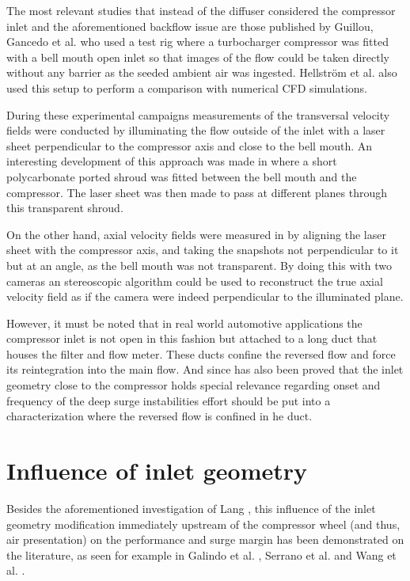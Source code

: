 The most relevant studies that instead of the diffuser considered the compressor inlet and the aforementioned backflow issue are those published by Guillou, Gancedo et al. \cite{guillou2010characterization,guillou2010surge,guillou2012piv,gancedo2016piv} who used a test rig where a turbocharger compressor was fitted with a bell mouth open inlet so that images of the flow could be taken directly without any barrier as the seeded ambient air was ingested. Hellström et al. \cite{hellstrom2010stall} also used this setup to perform a comparison with numerical CFD simulations.

During these experimental campaigns measurements of the transversal velocity fields were conducted by illuminating the flow outside of the inlet with a laser sheet perpendicular to the compressor axis and close to the bell mouth. An interesting development of this approach was made in \cite{gancedo2016piv} where a short polycarbonate ported shroud was fitted between the bell mouth and the compressor. The laser sheet was then made to pass at different planes through this transparent shroud.

On the other hand, axial velocity fields were measured in \cite{guillou2010characterization,guillou2012piv} by aligning the laser sheet with the compressor axis, and taking the snapshots not perpendicular to it but at an angle, as the bell mouth was not transparent. By doing this with two cameras an stereoscopic algorithm could be used to reconstruct the true axial velocity field as if the camera were indeed perpendicular to the illuminated plane.

However, it must be noted that in real world automotive applications the compressor inlet is not open in this fashion but attached to a long duct that houses the filter and flow meter. These ducts confine the reversed flow and force its reintegration into the main flow. And since has also been proved that the inlet geometry close to the compressor holds special relevance regarding onset and frequency of the deep surge instabilities \cite{galindo2013engine} effort should be put into a characterization where the reversed flow is confined in he duct.

\section{Influence of inlet geometry}
\label{sec:liter_influence}

Besides the aforementioned investigation of Lang \cite{lang2011contribucion}, this influence of the inlet geometry modification immediately upstream of the compressor wheel (and thus, air presentation) on the performance and surge margin has been demonstrated on the literature, as seen for example in Galindo et al. \cite{galindo2007potential}, Serrano et al. \cite{serrano2013optimization} and Wang et al. \cite{wang2013cha}.

